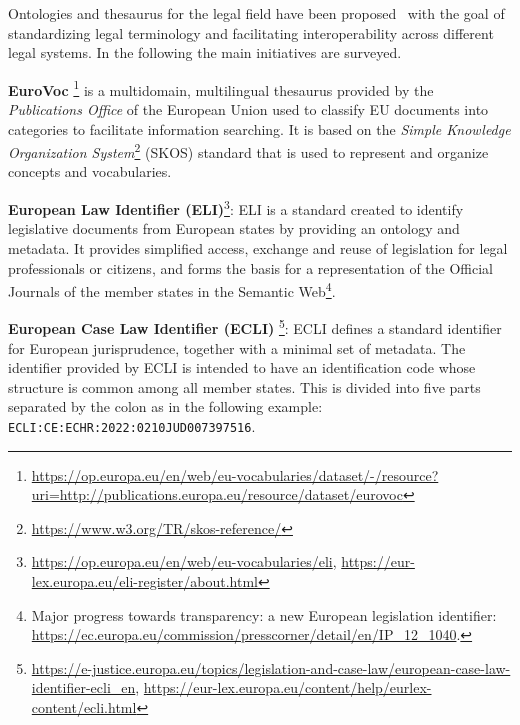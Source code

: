 \documentclass[runningheads]{llncs}
\begin{document}
Ontologies and thesaurus for the legal field have been proposed~\cite{Filtz21} with the goal of  %
standardizing legal terminology and facilitating interoperability across different legal systems. In the following the main initiatives are surveyed. %
\begin{description}
    \item \textbf{EuroVoc }\footnote{\url{https://op.europa.eu/en/web/eu-vocabularies/dataset/-/resource?uri=http://publications.europa.eu/resource/dataset/eurovoc}} is a multidomain, multilingual thesaurus provided by the \textit{Publications Office} of the European Union used to classify EU documents into categories to facilitate information searching. 
It is based on the \textit{Simple Knowledge Organization System}\footnote{\url{https://www.w3.org/TR/skos-reference/}} (SKOS) standard that is used to represent and organize concepts and vocabularies.
    \item \textbf{European Law Identifier (ELI)}\footnote{\url{https://op.europa.eu/en/web/eu-vocabularies/eli}, \url{https://eur-lex.europa.eu/eli-register/about.html}}: ELI is a standard created to identify legislative documents from European states by providing an ontology and metadata. It provides simplified access, exchange and reuse of legislation for legal professionals or citizens, and forms the basis for a representation of the Official Journals of the member states in the Semantic Web\footnote{Major progress towards transparency: a new European legislation identifier: \url{https://ec.europa.eu/commission/presscorner/detail/en/IP_12_1040}.}. 
    \item \textbf{European Case Law Identifier (ECLI)} \footnote{\url{https://e-justice.europa.eu/topics/legislation-and-case-law/european-case-law-identifier-ecli_en}, \url{https://eur-lex.europa.eu/content/help/eurlex-content/ecli.html}}: ECLI defines a  standard identifier  for European jurisprudence, together with a minimal set of metadata. The identifier provided by ECLI is intended to have an identification code whose structure is common among all member states. %
    This is divided into five parts separated by the colon as in the following example: \texttt{ECLI:CE:ECHR:2022:0210JUD007397516}.
\end{description}
\end{document}
